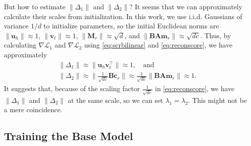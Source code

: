 \documentclass[11pt,a4paper]{article}
\newcommand{\mat}[1]{\bm{#1}}
\renewcommand{\vec}[1]{\bm{#1}}
\begin{document}
But how to estimate $\lVert\Delta_1\rVert$ and $\lVert\Delta_2\rVert$? It seems 
that we can approximately calculate their scales from initialization. In this 
work, we use i.i.d. Gaussians of variance $1/d$ to initialize parameters, 
so the initial Euclidean norms are $\lVert\vec{u}_h\rVert\approx 1$, 
$\lVert\vec{v}_t\rVert\approx 1$, 
$\lVert\mat{M}_r\rVert\approx\sqrt{d}$, and 
$\lVert\mat{B}\mat{A}\vec{m}_r\rVert\approx\sqrt{dc}$.
Thus, by calculating $\nabla\mathcal{L}_1$ and $\nabla\mathcal{L}_2$ using 
\eqref{eq:scrbilinear} and \eqref{eq:reconscore}, we have approximately 
\begin{gather}
\lVert\Delta_1\rVert\approx\lVert\vec{u}_h\vec{v}_t^\top\rVert\approx 1, 
\quad\text{and}\\
\lVert\Delta_2\rVert\approx\lVert\frac{1}{\sqrt{dc}}\mat{B}\vec{c}_r\rVert\approx
\frac{1}{\sqrt{dc}}\lVert\mat{B}\mat{A}\vec{m}_r\rVert\approx 1.
\end{gather}
It suggests that, because of the scaling factor $\frac{1}{\sqrt{dc}}$ in 
\eqref{eq:reconscore}, we have 
$\lVert\Delta_1\rVert$ and $\lVert\Delta_2\rVert$ at the same scale, so we can 
set $\lambda_1=\lambda_2$. This might not be a mere coincidence. 



\subsection{Training the Base Model}\label{sec:trainingbase}
\end{document}
